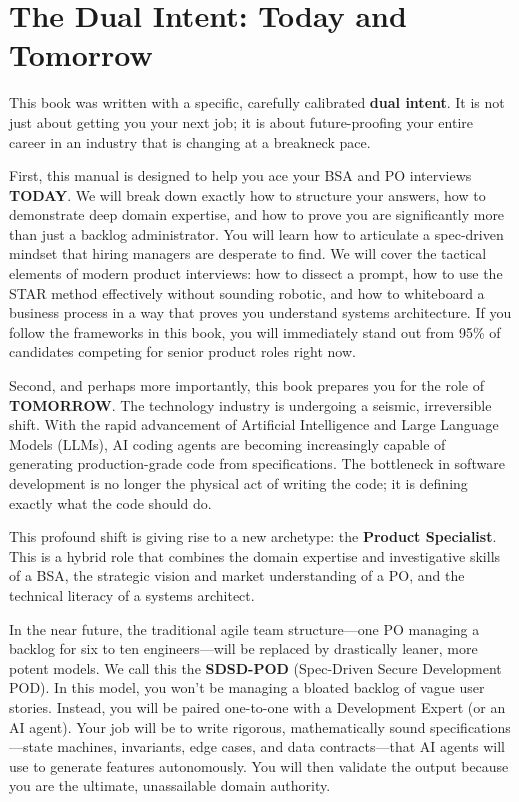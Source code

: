 \documentclass[
  11pt,
  openany,
  oneside]{book}
\begin{document}
\section{The Dual Intent: Today and
Tomorrow}\label{the-dual-intent-today-and-tomorrow}

This book was written with a specific, carefully calibrated \textbf{dual
intent}. It is not just about getting you your next job; it is about
future-proofing your entire career in an industry that is changing at a
breakneck pace.

First, this manual is designed to help you ace your BSA and PO
interviews \textbf{TODAY}. We will break down exactly how to structure
your answers, how to demonstrate deep domain expertise, and how to prove
you are significantly more than just a backlog administrator. You will
learn how to articulate a spec-driven mindset that hiring managers are
desperate to find. We will cover the tactical elements of modern product
interviews: how to dissect a prompt, how to use the STAR method
effectively without sounding robotic, and how to whiteboard a business
process in a way that proves you understand systems architecture. If you
follow the frameworks in this book, you will immediately stand out from
95\% of candidates competing for senior product roles right now.

Second, and perhaps more importantly, this book prepares you for the
role of \textbf{TOMORROW}. The technology industry is undergoing a
seismic, irreversible shift. With the rapid advancement of Artificial
Intelligence and Large Language Models (LLMs), AI coding agents are
becoming increasingly capable of generating production-grade code from
specifications. The bottleneck in software development is no longer the
physical act of writing the code; it is defining exactly what the code
should do.

This profound shift is giving rise to a new archetype: the
\textbf{Product Specialist}. This is a hybrid role that combines the
domain expertise and investigative skills of a BSA, the strategic vision
and market understanding of a PO, and the technical literacy of a
systems architect.

In the near future, the traditional agile team structure---one PO
managing a backlog for six to ten engineers---will be replaced by
drastically leaner, more potent models. We call this the
\textbf{SDSD-POD} (Spec-Driven Secure Development POD). In this model,
you won't be managing a bloated backlog of vague user stories. Instead,
you will be paired one-to-one with a Development Expert (or an AI
agent). Your job will be to write rigorous, mathematically sound
specifications---state machines, invariants, edge cases, and data
contracts---that AI agents will use to generate features autonomously.
You will then validate the output because you are the ultimate,
unassailable domain authority.
\end{document}
